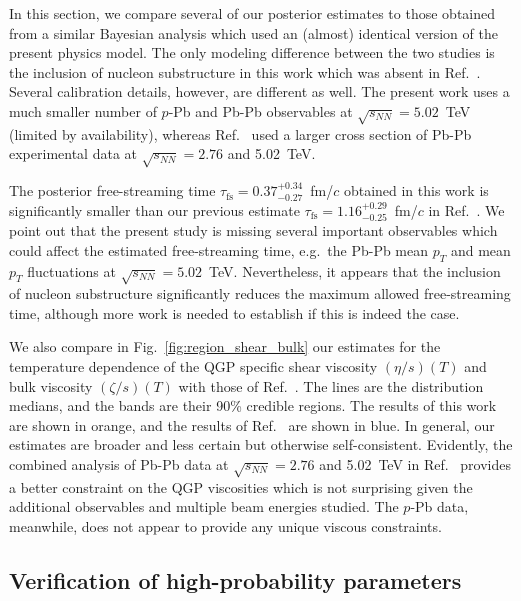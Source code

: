 \documentclass[aps,prc,reprint,amsmath,nofootinbib]{revtex4-1}
\newcommand{\sqrts}{\sqrt{s_{NN}}}
\newcommand{\taufs}{\tau_\text{fs}}
\begin{document}
In this section, we compare several of our posterior estimates to those obtained from a similar Bayesian analysis \cite{Bernhard:2018hnz} which used an (almost) identical version of the present physics model.
The only modeling difference between the two studies is the inclusion of nucleon substructure in this work which was absent in Ref.~\cite{Bernhard:2018hnz}.
Several calibration details, however, are different as well.
The present work uses a much smaller number of $p$-Pb and Pb-Pb observables at $\sqrts=5.02$~TeV (limited by availability), whereas Ref.~\cite{Bernhard:2018hnz} used a larger cross section of Pb-Pb experimental data at $\sqrts=2.76$ and 5.02~TeV.

The posterior free-streaming time $\taufs=0.37_{-0.27}^{+0.34}$~fm/$c$ obtained in this work is significantly smaller than our previous estimate $\taufs=1.16_{-0.25}^{+0.29}$~fm/$c$ in Ref.~\cite{Bernhard:2018hnz}.
We point out that the present study is missing several important observables which could affect the estimated free-streaming time, e.g.\ the Pb-Pb mean $p_T$ and mean $p_T$ fluctuations at $\sqrts=5.02$~TeV.
Nevertheless, it appears that the inclusion of nucleon substructure significantly reduces the maximum allowed free-streaming time, although more work is needed to establish if this is indeed the case.

We also compare in Fig.~\ref{fig:region_shear_bulk} our estimates for the temperature dependence of the QGP specific shear viscosity $(\eta/s)(T)$ and bulk viscosity $(\zeta/s)(T)$ with those of Ref.~\cite{Bernhard:2018hnz}.
The lines are the distribution medians, and the bands are their 90\% credible regions.
The results of this work are shown in orange, and the results of Ref.~\cite{Bernhard:2018hnz} are shown in blue.
In general, our estimates are broader and less certain but otherwise self-consistent.
Evidently, the combined analysis of Pb-Pb data at $\sqrts=2.76$ and 5.02~TeV in Ref.~\cite{Bernhard:2018hnz} provides a better constraint on the QGP viscosities which is not surprising given the additional observables and multiple beam energies studied.
The $p$-Pb data, meanwhile, does not appear to provide any unique viscous constraints.

\subsection{Verification of high-probability parameters}
\end{document}
